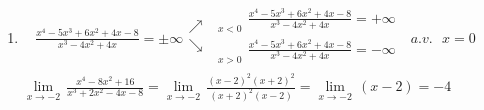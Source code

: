 \begin{solution}
\begin{enumerate}
\item $\underset{{}}{\mathop{\underset{x\to 0}{\mathop{\lim }}\,}}\,\frac{{{x}^{4}}-5{{x}^{3}}+6{{x}^{2}}+4x-8}{{{x}^{3}}-4{{x}^{2}}+4x}=\pm \infty \begin{matrix}
   \nearrow   \\
   \searrow   \\
\end{matrix}\begin{matrix}
   \underset{x<0}{\mathop{\underset{x\to 0}{\mathop{\lim }}\,}}\,\frac{{{x}^{4}}-5{{x}^{3}}+6{{x}^{2}}+4x-8}{{{x}^{3}}-4{{x}^{2}}+4x}=+\infty   \\
   \underset{x>0}{\mathop{\underset{x\to 0}{\mathop{\lim }}\,}}\,\frac{{{x}^{4}}-5{{x}^{3}}+6{{x}^{2}}+4x-8}{{{x}^{3}}-4{{x}^{2}}+4x}=-\infty   \\
\end{matrix}\text{         }a.v.\text{ }x=0$
$\underset{x\to -2}{\mathop{\lim }}\,\frac{{{x}^{4}}-8{{x}^{2}}+16}{{{x}^{3}}+2{{x}^{2}}-4x-8}=\underset{x\to -2}{\mathop{\lim }}\,\frac{{{\left( x-2 \right)}^{2}}{{\left( x+2 \right)}^{2}}}{{{\left( x+2 \right)}^{2}}\left( x-2 \right)}=\underset{x\to -2}{\mathop{\lim }}\,\left( x-2 \right)=-4$
\end{enumerate}
\end{solution}

